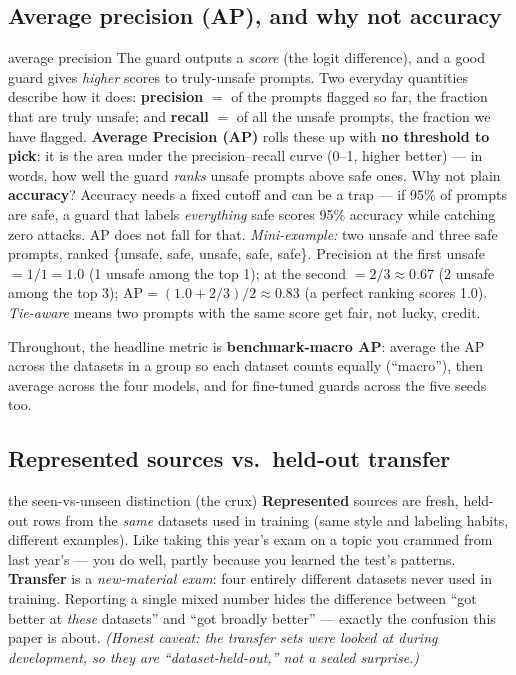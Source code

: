 \documentclass[11pt]{article}
\begin{document}
\subsection{Average precision (AP), and why not accuracy}
\label{subsec:ap}
\begin{background}{average precision}
\small
The guard outputs a \emph{score} (the logit difference), and a good guard gives
\emph{higher} scores to truly-unsafe prompts. Two everyday quantities describe how it does:
\textbf{precision} $=$ of the prompts flagged so far, the fraction that are truly unsafe; and
\textbf{recall} $=$ of all the unsafe prompts, the fraction we have flagged.
\textbf{Average Precision (AP)} rolls these up with \textbf{no threshold to pick}: it is the
area under the precision--recall curve (0--1, higher better) --- in words, how well the guard
\emph{ranks} unsafe prompts above safe ones. Why not plain \textbf{accuracy}? Accuracy needs a
fixed cutoff and can be a trap --- if 95\% of prompts are safe, a guard that labels
\emph{everything} safe scores 95\% accuracy while catching zero attacks. AP does not fall for
that. \emph{Mini-example:} two unsafe and three safe prompts, ranked
\{unsafe, safe, unsafe, safe, safe\}. Precision at the first unsafe $=1/1=1.0$ (1 unsafe among
the top 1); at the second $=2/3\approx0.67$ (2 unsafe among the top 3);
$\text{AP}=(1.0+2/3)/2\approx\mathbf{0.83}$ (a perfect ranking scores 1.0).
\emph{Tie-aware} means two prompts with the same score get fair, not lucky, credit.
\end{background}
\noindent Throughout, the headline metric is \textbf{benchmark-macro AP}: average the AP
across the datasets in a group so each dataset counts equally (``macro''), then average across
the four models, and for fine-tuned guards across the five seeds too.

\subsection{Represented sources vs.\ held-out transfer}
\label{subsec:regimes}
\begin{background}{the seen-vs-unseen distinction (the crux)}
\small
\textbf{Represented} sources are fresh, held-out rows from the \emph{same} datasets used in
training (same style and labeling habits, different examples). Like taking this year's exam
on a topic you crammed from last year's --- you do well, partly because you learned the test's
patterns. \textbf{Transfer} is a \emph{new-material exam}: four entirely different datasets
never used in training. Reporting a single mixed number hides the difference between ``got
better at \emph{these} datasets'' and ``got broadly better'' --- exactly the confusion this
paper is about. \emph{(Honest caveat: the transfer sets were looked at during development, so
they are ``dataset-held-out,'' not a sealed surprise.)}
\end{background}
\end{document}
